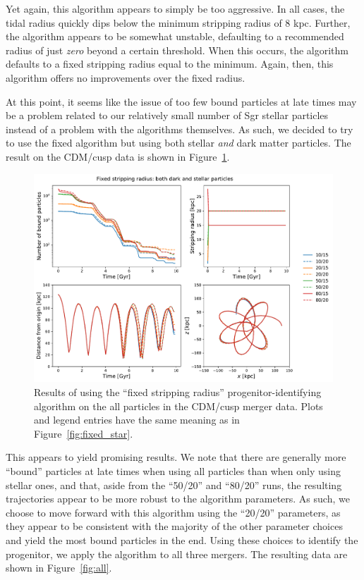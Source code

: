 Yet again, this algorithm appears to simply be too aggressive. In all cases, the
tidal radius quickly dips below the minimum stripping radius of 8 kpc. Further,
the algorithm appears to be somewhat unstable, defaulting to a recommended
radius of just \textit{zero} beyond a certain threshold. When this occurs, the
algorithm defaults to a fixed stripping radius equal to the minimum. Again,
then, this algorithm offers no improvements over the fixed radius.

At this point, it seems like the issue of too few bound particles at late times
may be a problem related to our relatively small number of Sgr stellar particles
instead of a problem with the algorithms themselves.  As such, we decided to
try to use the fixed algorithm but using both stellar \textit{and} dark matter
particles.  The result on the CDM/cusp data is shown in
Figure~\ref{fig:fixed_both}.

\begin{figure}
    \centering
    \includegraphics[width=0.9\linewidth]{figs/fixed_both.pdf}
    \caption{%
        Results of using the ``fixed stripping radius'' progenitor-identifying
        algorithm on the all particles in the CDM/cusp merger data. Plots and
        legend entries have the same meaning as in
        Figure~\ref{fig:fixed_star}.
    }
    \label{fig:fixed_both}
\end{figure}

This appears to yield promising results. We note that there are generally more
``bound'' particles at late times when using all particles than when only using
stellar ones, and that, aside from the ``50/20'' and ``80/20'' runs, the
resulting trajectories appear to be more robust to the algorithm parameters. As
such, we choose to move forward with this algorithm using the ``20/20''
parameters, as they appear to be consistent with the majority of the other
parameter choices and yield the most bound particles in the end. Using these
choices to identify the progenitor, we apply the algorithm to all three mergers.
The resulting data are shown in Figure~\ref{fig:all}.

